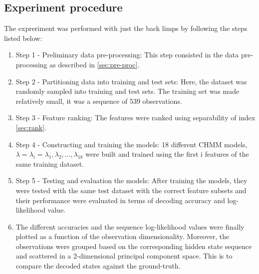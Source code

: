 \subsection{Experiment procedure}
The expreriment was performed with just the back limps by following the steps listed below:
\begin{enumerate}
	\item Step 1 - Preliminary data pre-processing: This step consisted in the data pre-processing as described in \ref{sec:pre-proc}.
	\item Step 2 - Partitioning data into training and test sets: Here, the dataset was randomly sampled into training and test sets. The training set was made relatively small, it was a sequence of 539 observations. 
	\item Step 3 -  Feature ranking: The features were ranked using separability of index \ref{sec:rank}. 
	\item Step 4 - Constructing and training the models: 18 different CHMM models, \(\lambda = {\lambda_i} = \lambda_1, \lambda_2, ..., \lambda_18\) were built and trained using the first i features of the same training dataset.
	\item Step 5 - Testing and evaluation the models: After training the models, they were tested with the same test dataset with the correct feature subsets and their performance were evaluated in terms of decoding accuracy and log-likelihood value. 
	\item The different accuracies and the sequence log-likelihood values were finally plotted as a function of the observation dimensionality. Moreover, the observations were grouped based on the corresponding hidden state sequence and scattered in a 2-dimensional principal component space. This is to compare the decoded states against the ground-truth.
\end{enumerate}

